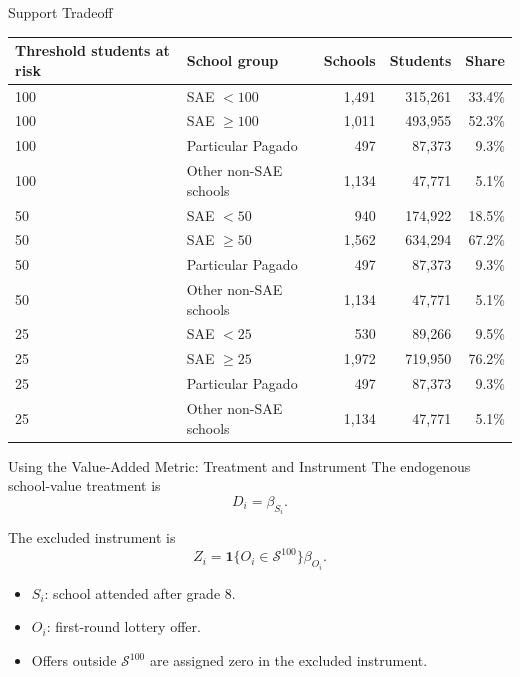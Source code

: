 \documentclass[notes,11pt,aspectratio=169]{beamer}
\newenvironment{wideitemize}{%
  \begin{minipage}{0.90\textwidth}
  \begin{itemize}
  \addtolength{\itemsep}{1em}
}{%
  \end{itemize}
  \end{minipage}
}
\begin{document}
\begin{frame}{Support Tradeoff}
\centering
\tiny
\begin{tabular}{llrrr}
\toprule
Threshold students at risk & School group & Schools & Students & Share \\
\midrule
100 & SAE \(<100\) & 1,491 & 315,261 & 33.4\% \\
100 & SAE \(\geq100\) & 1,011 & 493,955 & 52.3\% \\
100 & Particular Pagado & 497 & 87,373 & 9.3\% \\
100 & Other non-SAE schools & 1,134 & 47,771 & 5.1\% \\
\midrule
50 & SAE \(<50\) & 940 & 174,922 & 18.5\% \\
50 & SAE \(\geq50\) & 1,562 & 634,294 & 67.2\% \\
50 & Particular Pagado & 497 & 87,373 & 9.3\% \\
50 & Other non-SAE schools & 1,134 & 47,771 & 5.1\% \\
\midrule
25 & SAE \(<25\) & 530 & 89,266 & 9.5\% \\
25 & SAE \(\geq25\) & 1,972 & 719,950 & 76.2\% \\
25 & Particular Pagado & 497 & 87,373 & 9.3\% \\
25 & Other non-SAE schools & 1,134 & 47,771 & 5.1\% \\
\bottomrule
\end{tabular}
\end{frame}

\begin{frame}{Using the Value-Added Metric: Treatment and Instrument}
\small
The endogenous school-value treatment is
\[
D_i
=
\beta_{S_i}.
\]

The excluded instrument is
\[
Z_i
=
\mathbf{1}\{O_i\in\mathcal{S}^{100}\}
\beta_{O_i}.
\]

\vspace{0.5em}
\begin{wideitemize}
  \item \(S_i\): school attended after grade 8.
  \item \(O_i\): first-round lottery offer.
  \item Offers outside \(\mathcal{S}^{100}\) are assigned zero in the excluded instrument.
\end{wideitemize}
\end{frame}
\end{document}
